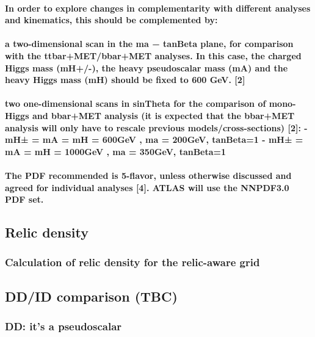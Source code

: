 \paragraph{In order to explore changes in complementarity with different
analyses and kinematics, this should be complemented by:}

\paragraph{a two-dimensional scan in the ma − tanBeta plane, for
comparison with the ttbar+MET/bbar+MET analyses. In this case, the
charged Higgs mass (mH+/-), the heavy pseudoscalar mass (mA) and the
heavy Higgs mass (mH) should be fixed to 600 GeV. {[}2{]}}

\paragraph{two one-dimensional scans in sinTheta for the comparison of
mono-Higgs and bbar+MET analysis (it is expected that the bbar+MET
analysis will only have to rescale previous models/cross-sections)
{[}2{]}: - mH± = mA = mH = 600GeV , ma = 200GeV, tanBeta=1 - mH± = mA =
mH = 1000GeV , ma = 350GeV, tanBeta=1}

\paragraph{The PDF recommended is 5-flavor, unless otherwise discussed
and agreed for individual analyses {[}4{]}. ATLAS will use the NNPDF3.0
PDF set.}

\subsection{Relic density}

\subsubsection{Calculation of relic density for the relic-aware grid}

\subsection{DD/ID comparison (TBC)}

\subsubsection{DD: it's a pseudoscalar}

